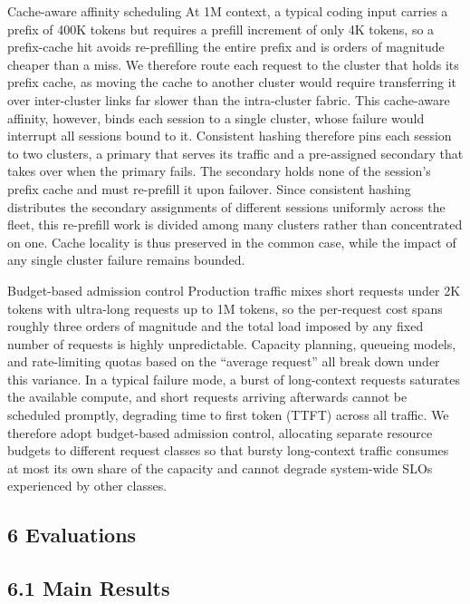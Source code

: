 \documentclass[
  10
]{article}
\newcounter{none} %
\begin{document}
Cache-aware affinity scheduling At 1M context, a typical coding input
carries a prefix of 400K tokens but requires a prefill increment of only
4K tokens, so a prefix-cache hit avoids re-prefilling the entire prefix
and is orders of magnitude cheaper than a miss. We therefore route each
request to the cluster that holds its prefix cache, as moving the cache
to another cluster would require transferring it over inter-cluster
links far slower than the intra-cluster fabric. This cache-aware
affinity, however, binds each session to a single cluster, whose failure
would interrupt all sessions bound to it. Consistent hashing therefore
pins each session to two clusters, a primary that serves its traffic and
a pre-assigned secondary that takes over when the primary fails. The
secondary holds none of the session's prefix cache and must re-prefill
it upon failover. Since consistent hashing distributes the secondary
assignments of different sessions uniformly across the fleet, this
re-prefill work is divided among many clusters rather than concentrated
on one. Cache locality is thus preserved in the common case, while the
impact of any single cluster failure remains bounded.

Budget-based admission control Production traffic mixes short requests
under 2K tokens with ultra-long requests up to 1M tokens, so the
per-request cost spans roughly three orders of magnitude and the total
load imposed by any fixed number of requests is highly unpredictable.
Capacity planning, queueing models, and rate-limiting quotas based on
the ``average request'' all break down under this variance. In a typical
failure mode, a burst of long-context requests saturates the available
compute, and short requests arriving afterwards cannot be scheduled
promptly, degrading time to first token (TTFT) across all traffic. We
therefore adopt budget-based admission control, allocating separate
resource budgets to different request classes so that bursty
long-context traffic consumes at most its own share of the capacity and
cannot degrade system-wide SLOs experienced by other classes.

\subsection{6 Evaluations}\label{evaluations}

\subsection{6.1 Main Results}\label{main-results}
\end{document}
